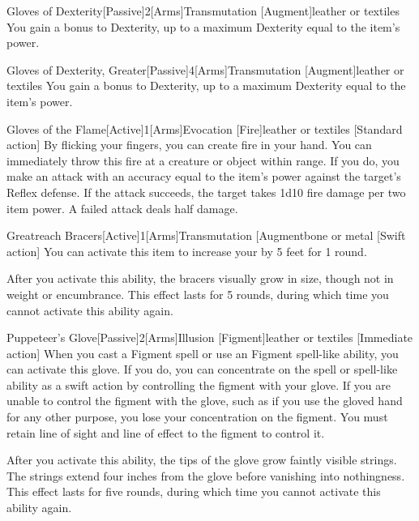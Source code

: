\begin{magicitemdef}{Gloves of Dexterity}[Passive]{2}[Arms]{Transmutation [Augment]}{leather or textiles}
     You gain a  bonus to Dexterity, up to a maximum Dexterity equal to the item's power.
\end{magicitemdef}

\begin{magicitemdef}{Gloves of Dexterity, Greater}[Passive]{4}[Arms]{Transmutation [Augment]}{leather or textiles}
     You gain a  bonus to Dexterity, up to a maximum Dexterity equal to the item's power.
\end{magicitemdef}

\begin{magicitemdef}{Gloves of the Flame}[Active]{1}[Arms]{Evocation [Fire]}{leather or textiles}
    [Standard action] By flicking your fingers, you can create fire in your hand.
    You can immediately throw this fire at a creature or object within \rngclose range.
    If you do, you make an attack with an accuracy equal to the item's power against the target's Reflex defense.
    If the attack succeeds, the target takes 1d10 fire damage per two item power.
    A failed attack deals half damage.
\end{magicitemdef}

\begin{magicitemdef}{Greatreach Bracers}[Active]{1}[Arms]{Transmutation [Augment}{bone or metal}
    [Swift action] You can activate this item to increase your  by 5 feet for 1 round.

    After you activate this ability, the bracers visually grow in size, though not in weight or encumbrance.
    This effect lasts for 5 rounds, during which time you cannot activate this ability again.
\end{magicitemdef}

\begin{magicitemdef}{Puppeteer's Glove}[Passive]{2}[Arms]{Illusion [Figment]}{leather or textiles}
    [Immediate action] When you cast a Figment spell or use an Figment spell-like ability, you can activate this glove.
    If you do, you can concentrate on the spell or spell-like ability as a swift action by controlling the figment with your glove.
    If you are unable to control the figment with the glove, such as if you use the gloved hand for any other purpose, you lose your concentration on the figment.
    You must retain line of sight and line of effect to the figment to control it.

    After you activate this ability, the tips of the glove grow faintly visible strings.
    The strings extend four inches from the glove before vanishing into nothingness.
    This effect lasts for five rounds, during which time you cannot activate this ability again.
\end{magicitemdef}

